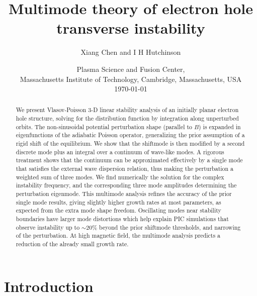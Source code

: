 \documentclass{jpp}
\def\affiliation#1{\date{\normalsize #1\\ \today}}
\begin{document}
\title{Multimode theory of electron hole transverse instability}
\author{Xiang Chen and I H Hutchinson}
\affiliation{Plasma Science and Fusion Center,\\ Massachusetts
  Institute of Technology, Cambridge, Massachusetts, USA} 

\ifx\altaffiliation\undefined\maketitle\fi %

\begin{abstract}
We present Vlasov-Poisson 3-D linear stability analysis of an
initially planar electron hole structure, solving for the distribution
function by integration along unperturbed orbits. The non-sinusoidal
potential perturbation shape (parallel to $B$) is expanded in
eigenfunctions of the adiabatic Poisson operator, generalizing the
prior assumption of a rigid shift of the equilibrium.  We show that
the shiftmode is then modified by a second discrete mode plus an
integral over a continuum of wave-like modes. A rigorous treatment
shows that the continuum can be approximated effectively by a single
mode that satisfies the external wave dispersion relation, thus making
the perturbation a weighted sum of three modes. We find numerically
the solution for the complex instability frequency, and the
corresponding three mode amplitudes determining the perturbation
eigenmode. This multimode analysis refines the accuracy of the prior
single mode results, giving slightly higher growth rates at most
parameters, as expected from the extra mode shape freedom. Oscillating
modes near stability boundaries have larger mode distortions which
help explain PIC simulations that observe instability up to $\sim20$\%
beyond the prior shiftmode thresholds, and narrowing of the
perturbation. At high magnetic field, the multimode analysis predicts
a reduction of the already small growth rate.
\end{abstract}

\section{Introduction}
\end{document}
